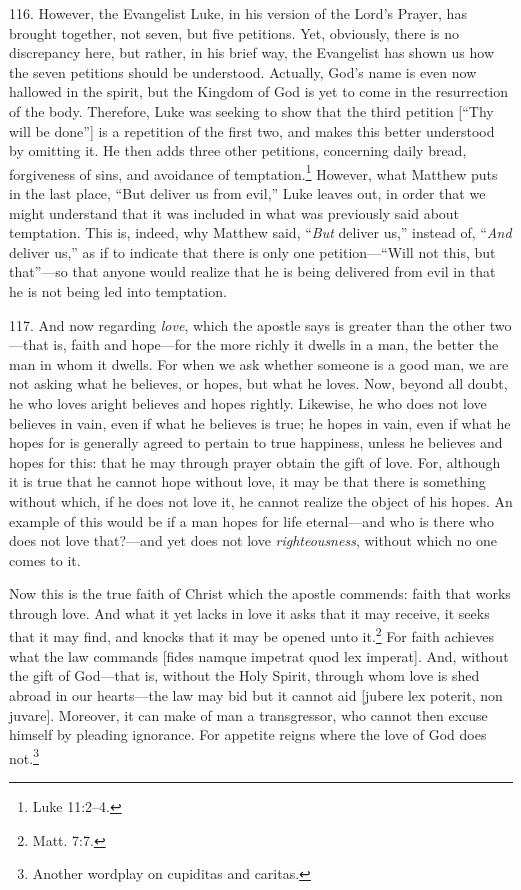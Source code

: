116. However, the Evangelist Luke, in his version of the Lord's Prayer, has brought together, not seven, but five petitions. Yet, obviously, there is no discrepancy here, but rather, in his brief way, the Evangelist has shown us how the seven petitions should be understood. Actually, God's name is even now hallowed in the spirit, but the Kingdom of God is yet to come in the resurrection of the body. Therefore, Luke was seeking to show that the third petition [``Thy will be done''] is a repetition of the first two, and makes this better understood by omitting it. He then adds three other petitions, concerning daily bread, forgiveness of sins, and avoidance of temptation.\footnote{Luke 11:2–4.} However, what Matthew puts in the last place, ``But deliver us from evil,'' Luke leaves out, in order that we might understand that it was included in what was previously said about temptation. This is, indeed, why Matthew said, ``\emph{But} deliver us,'' instead of, ``\emph{And} deliver us,'' as if to indicate that there is only one petition—``Will not this, but that''—so that anyone would realize that he is being delivered from evil in that he is not being led into temptation.


117. And now regarding \emph{love}, which the apostle says is greater than the other two—that is, faith and hope—for the more richly it dwells in a man, the better the man in whom it dwells. For when we ask whether someone is a good man, we are not asking what he believes, or hopes, but what he loves. Now, beyond all doubt, he who loves aright believes and hopes rightly. Likewise, he who does not love believes in vain, even if what he believes is true; he hopes in vain, even if what he hopes for is generally agreed to pertain to true happiness, unless he believes and hopes for this: that he may through prayer obtain the gift of love. For, although it is true that he cannot hope without love, it may be that there is something without which, if he does not love it, he cannot realize the object of his hopes. An example of this would be if a man hopes for life eternal—and who is there who does not love that?—and yet does not love \emph{righteousness}, without which no one comes to it.

Now this is the true faith of Christ which the apostle commends: faith that works through love. And what it yet lacks in love it asks that it may receive, it seeks that it may find, and knocks that it may be opened unto it.\footnote{Matt. 7:7.} For faith achieves what the law commands [fides namque impetrat quod lex imperat]. And, without the gift of God—that is, without the Holy Spirit, through whom love is shed abroad in our hearts—the law may bid but it cannot aid [jubere lex poterit, non juvare]. Moreover, it can make of man a transgressor, who cannot then excuse himself by pleading ignorance. For appetite reigns where the love of God does not.\footnote{Another wordplay on cupiditas and caritas.}

